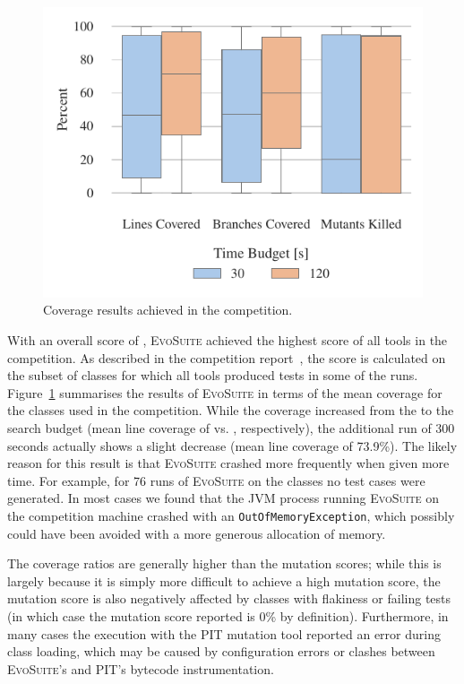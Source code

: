 \documentclass[sigconf,review,anonymous]{acmart}
\newcommand{\EVOSUITE}{\textsc{EvoSuite}\xspace}
\begin{document}
\begin{figure}
	\centering
	\includegraphics[width=\columnwidth]{data/CoverageBoxV}
	\vspace{-2em}
	\caption{\label{fig:results}Coverage results achieved in the competition.}
	\vspace{-1em}
\end{figure}


With an overall score of \score, \EVOSUITE achieved the highest score of all
tools in the competition. As described in the competition
report~\cite{SBST-toolcomp22}, the score is calculated on the subset of \cuts classes
for which all tools produced tests in some of the runs.
Figure~\ref{fig:results} summarises the results of \EVOSUITE in terms of the
mean coverage for the \cuts classes used in the competition. While the coverage
increased from the \budgetShort to the \budgetLong search budget (mean line
coverage of \avgLinesCoverageRatioShort vs. \avgLinesCoverageRatioLong, respectively),
the additional run of 300 seconds
actually shows a slight decrease (mean line coverage of 73.9\%). The likely
reason for this result is that \EVOSUITE crashed more frequently when given
more time. For example, for 76 runs of \EVOSUITE on the \cuts classes no test
cases were generated. In most cases we found that the JVM process running
\EVOSUITE on the competition machine crashed with an
\texttt{OutOfMemoryException}, which possibly could have been avoided with a
more generous allocation of memory.

The coverage ratios are generally higher than the mutation scores; while this is largely because it is simply more difficult to achieve a high mutation score, the mutation score is also negatively affected by classes with flakiness or failing tests (in which case the mutation score reported is 0\% by definition). Furthermore, in many cases the execution with the PIT mutation tool reported an error during class loading, which may be caused by configuration errors or clashes between \EVOSUITE's and PIT's bytecode instrumentation.
\end{document}
